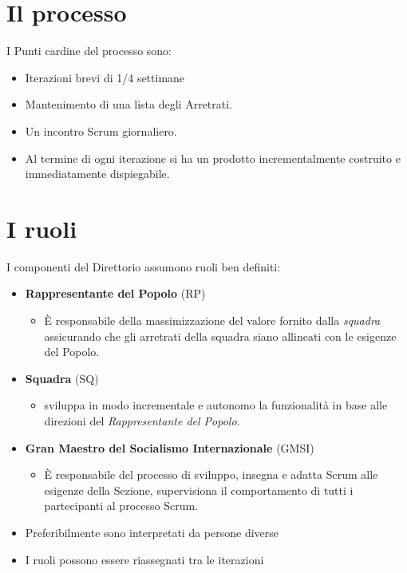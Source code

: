 \section{Il processo}


I Punti cardine del processo sono:
\begin{itemize}
  \item Iterazioni brevi di 1/4 settimane
  \item Mantenimento di una lista degli Arretrati.
  \item Un incontro Scrum giornaliero.
  \item Al termine di ogni iterazione si ha un prodotto incrementalmente costruito e immediatamente dispiegabile.
\end{itemize}

\section{I ruoli}

I componenti del Direttorio assumono ruoli ben definiti:
\begin{itemize}
  \item \textbf{Rappresentante del Popolo} (RP)
  \begin{itemize}
    \item \`E responsabile della massimizzazione del valore fornito dalla \textit{squadra} assicurando che gli arretrati della squadra siano allineati con le esigenze del Popolo.
  \end{itemize}
  \item \textbf{Squadra} (SQ)
  \begin{itemize}
    \item sviluppa in modo incrementale e autonomo la funzionalit\`a in base alle direzioni del \textit{Rappresentante del Popolo}.
  \end{itemize}
  \item \textbf{Gran Maestro del Socialismo Internazionale} (GMSI)
  \begin{itemize}
    \item \`E responsabile del processo di sviluppo, insegna e adatta Scrum alle esigenze della Sezione, supervisiona il comportamento di tutti i partecipanti al processo Scrum.
  \end{itemize}
  \item Preferibilmente sono interpretati da persone diverse
  \item I ruoli possono essere riassegnati tra le iterazioni
\end{itemize}

